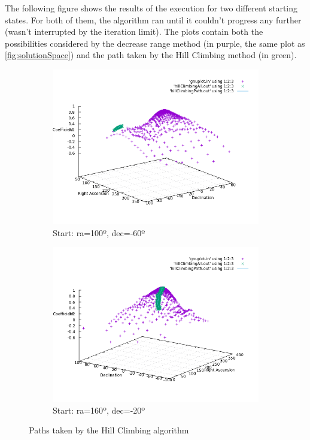 The following figure shows the results of the execution for two different starting states. For both of them, the algorithm ran until it couldn't progress any further (wasn't interrupted by the iteration limit). The plots contain both the possibilities considered by the decrease range method (in purple, the same plot as \ref{fig:solutionSpace}) and the path taken by the Hill Climbing method (in green).

\begin{figure}[!htb]
	\begin{subfigure}[b]{0.5\textwidth}
		\includegraphics[width=\linewidth]{images/ch6/hillClimbing/resultsPathBad.png}
		\caption{Start: ra=100º, dec=-60º}
	\end{subfigure}
	\hfill
	\begin{subfigure}[b]{0.5\textwidth}
		\includegraphics[width=\linewidth]{images/ch6/hillClimbing/resultsPathGood.png}
		\caption{Start: ra=160º, dec=-20º}
	\end{subfigure}
	\caption{Paths taken by the Hill Climbing algorithm}
	\label{fig:hillClimbingPaths}
\end{figure}


